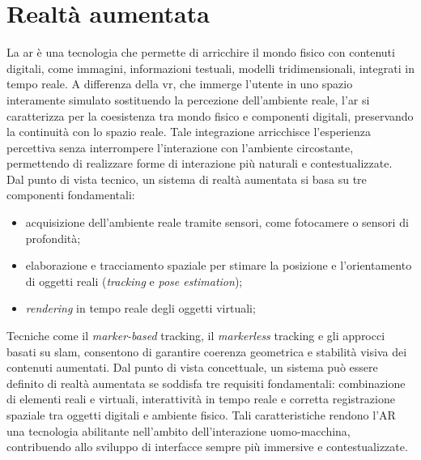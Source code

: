 \documentclass[12pt,a4paper,openright,oneside]{book}
\begin{document}
\section{Realtà aumentata}\label{sec:realta_aumentata} %
La \acf{ar} è una tecnologia che permette di arricchire il mondo fisico con contenuti digitali, come immagini, informazioni testuali, modelli tridimensionali, integrati in tempo reale.
A differenza della \acf{vr}, che immerge l’utente in uno spazio interamente simulato sostituendo la percezione dell’ambiente reale, l’\ac{ar} si caratterizza per la coesistenza tra mondo fisico e componenti digitali, preservando la continuità con lo spazio reale.
Tale integrazione arricchisce l’esperienza percettiva senza interrompere l’interazione con l’ambiente circostante, permettendo di realizzare forme di interazione più naturali e contestualizzate.
\\
Dal punto di vista tecnico, un sistema di realtà aumentata si basa su tre componenti fondamentali:
\begin{itemize}
    \item acquisizione dell’ambiente reale tramite sensori, come fotocamere o sensori di profondità;
    \item elaborazione e tracciamento spaziale per stimare la posizione e l'orientamento di oggetti reali (\textit{tracking} e \textit{pose estimation});
    \item \textit{rendering} in tempo reale degli oggetti virtuali;
\end{itemize}
Tecniche come il \textit{marker-based} tracking, il \textit{markerless} tracking e gli approcci basati su \ac{slam}, consentono di garantire coerenza geometrica e stabilità visiva dei contenuti aumentati.
Dal punto di vista concettuale, un sistema può essere definito di realtà aumentata se soddisfa tre requisiti fondamentali: combinazione di elementi reali e virtuali, interattività in tempo reale e corretta registrazione spaziale tra oggetti digitali e ambiente fisico.
Tali caratteristiche rendono l’AR una tecnologia abilitante nell’ambito dell’interazione uomo-macchina, contribuendo allo sviluppo di interfacce sempre più immersive e contestualizzate.
%
\end{document}
